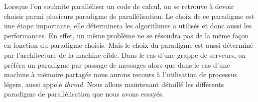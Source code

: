 Lorsque l'on souhaite paralléliser un code de calcul, on se retrouve à devoir choisir parmi plusieurs paradigme de parallélisation.
%
Le choix de ce paradigme est une étape importante, elle déterminera les algorithmes a utilisés et donc aussi les performances.
%
En effet, un même problème ne se résoudra pas de la même façon en fonction du paradigme choisis.
%
Mais le choix du paradigme est aussi déterminé par l'architecture de la machine cible.
%
Dans le cas d'une grappe de serveurs, on préféra un paradigme par passage de messages alors que dans le cas d'une machine à mémoire partagée nous aurons recours à l'utilisation de processus légers, aussi appelé {\em thread}.
%
Nous allons maintenant détaillé les différents paradigme de parallélisation que nous avons essayés.
